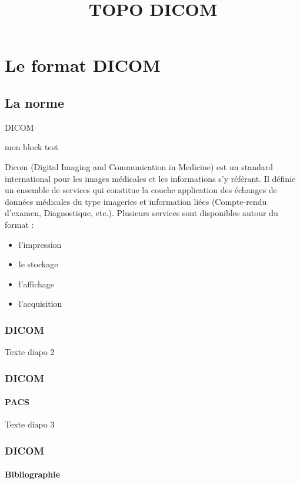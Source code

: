 \documentclass[t, 8pt]{beamer}
\begin{document}
\title{TOPO DICOM}
\section{Le format DICOM}
\subsection{La norme}

\begin{frame}{DICOM}
\begin{block}{mon block}
test
\end{block}
Dicom (Digital Imaging and Communication in Medicine) est un standard international pour les images médicales et les informations s'y référant. Il définie un ensemble de services qui constitue la couche application des échanges de données médicales du type imageries et information liées (Compte-rendu d'examen, Diagnostique, etc.). \cite{nema15:_dicom_ps3}
Plusieurs services sont disponibles autour du format :
\begin{itemize}
\item[\ding{213}] l'impression
\item[\ding{213}] le stockage
\item[\ding{213}] l'affichage
\item[\ding{213}] l'acquisition
\end{itemize}
\end{frame}

\begin{frame}[fragile]
\frametitle{DICOM}
Texte diapo 2
\end{frame}

\begin{frame}[b]
\frametitle{DICOM}
\framesubtitle{PACS}
Texte diapo 3
\end{frame}

\begin{frame}[b]
\frametitle{DICOM}
\framesubtitle{Bibliographie}


\end{frame}
\end{document}
